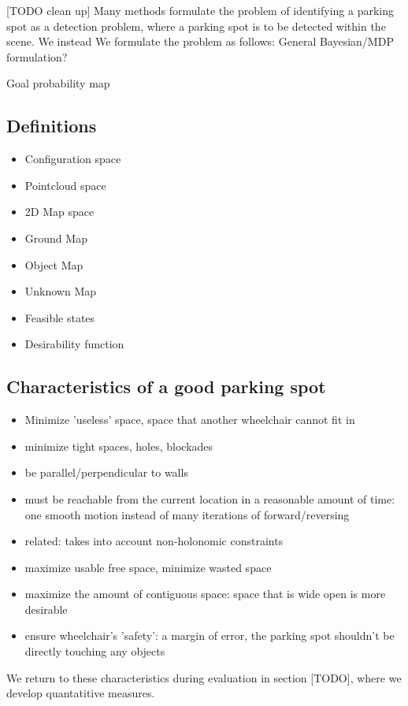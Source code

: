 [TODO clean up]
Many methods formulate the problem of identifying a parking spot
as a detection problem, where a parking spot is to be detected within the scene.
We instead 
We formulate the problem as follows: General Bayesian/MDP formulation?

Goal probability map

\subsection{Definitions}

\begin{itemize}
\item Configuration space
\item Pointcloud space
\item 2D Map space
\item Ground Map
\item Object Map
\item Unknown Map
\item Feasible states
\item Desirability function
\end{itemize}

\subsection{Characteristics of a good parking spot}
\begin{itemize}
\item Minimize 'useless' space, space that another wheelchair cannot fit in 
\item minimize tight spaces, holes, blockades
\item be parallel/perpendicular to walls
\item must be reachable from the current location in a reasonable amount of
time: one smooth motion instead of many iterations of forward/reversing
\item related: takes into account non-holonomic constraints
\item maximize usable free space, minimize wasted space
\item maximize the amount of contiguous space: space that is wide open is more
desirable
\item ensure wheelchair's 'safety': a margin of error, the parking spot
shouldn't be directly touching any objects
\end{itemize}

We return to these characteristics during evaluation in section [TODO], where we
develop quantatitive measures.


